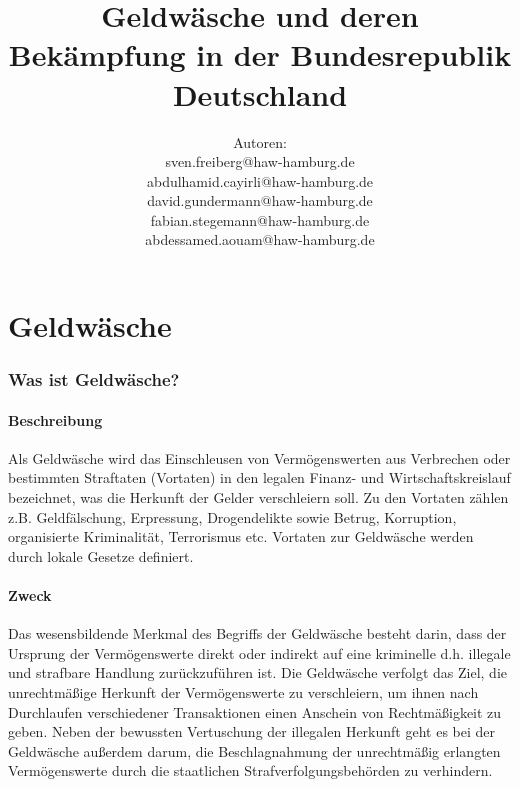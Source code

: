 \documentclass{article}
\begin{document}
\title{Geldwäsche und deren Bekämpfung in der Bundesrepublik Deutschland}
\author{
    Autoren:\\
    sven.freiberg@haw-hamburg.de\\ 
    abdulhamid.cayirli@haw-hamburg.de\\
    david.gundermann@haw-hamburg.de\\
    fabian.stegemann@haw-hamburg.de\\
    abdessamed.aouam@haw-hamburg.de
}
\maketitle

\tableofcontents


\newpage

\part[Geldwäsche]{Geldwäsche}

    \section[Was ist Geldwäsche?]{Was ist Geldwäsche?}
            
        \subsection[Beschreibung]{Beschreibung}

            Als Geldwäsche wird das Einschleusen von Vermögenswerten aus Verbrechen oder bestimmten Straftaten (Vortaten) in den legalen Finanz- und Wirtschaftskreislauf bezeichnet, was die Herkunft der Gelder verschleiern soll. Zu den Vortaten zählen z.B. Geldfälschung, Erpressung, Drogendelikte sowie Betrug, Korruption, organisierte Kriminalität, Terrorismus etc. Vortaten zur Geldwäsche werden durch lokale Gesetze definiert.
        
        \subsection[Zweck]{Zweck}

            Das wesensbildende Merkmal des Begriffs der Geldwäsche besteht darin, dass der Ursprung der Vermögenswerte direkt oder indirekt auf eine kriminelle d.h. illegale und strafbare Handlung zurückzuführen ist.
            Die Geldwäsche verfolgt das Ziel, die unrechtmäßige Herkunft der Vermögenswerte zu verschleiern, um ihnen nach Durchlaufen verschiedener Transaktionen einen Anschein von Rechtmäßigkeit zu geben. 
            Neben der bewussten Vertuschung der illegalen Herkunft geht es bei der Geldwäsche außerdem darum, die Beschlagnahmung der unrechtmäßig erlangten Vermögenswerte durch die staatlichen Strafverfolgungsbehörden zu verhindern.
\end{document}
